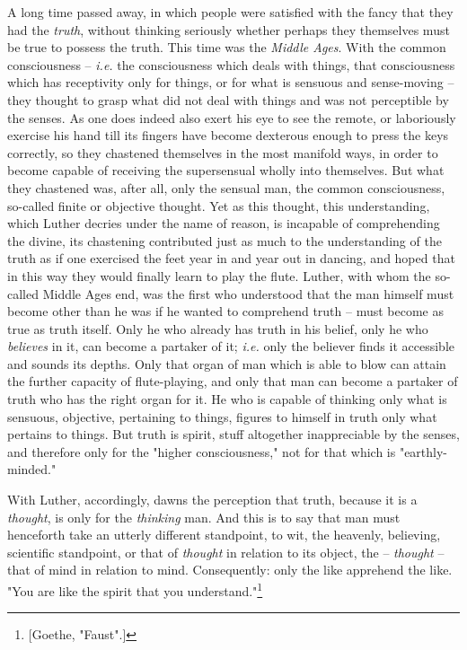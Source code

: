 A long time passed away, in which people were satisfied with the fancy that 
they had the \textit{truth}, without thinking seriously whether perhaps they 
themselves must be true to possess the truth. This time was the \textit{Middle 
Ages}. With the common consciousness -- \textit{i.e.} the consciousness which 
deals with things, that consciousness which has receptivity only for things, 
or for what is sensuous and sense-moving -- they thought to grasp what did not 
deal with things and was not perceptible by the senses. As one does indeed 
also exert his eye to see the remote, or laboriously exercise his hand till 
its fingers have become dexterous enough to press the keys correctly, so they 
chastened themselves in the most manifold ways, in order to become capable of 
receiving the supersensual wholly into themselves. But what they chastened 
was, after all, only the sensual man, the common consciousness, so-called 
finite or objective thought. Yet as this thought, this understanding, which 
Luther decries under the name of reason, is incapable of comprehending the 
divine, its chastening contributed just as much to the understanding of the 
truth as if one exercised the feet year in and year out in dancing, and hoped 
that in this way they would finally learn to play the flute. Luther, with whom 
the so-called Middle Ages end, was the first who understood that the man 
himself must become other than he was if he wanted to comprehend truth -- must 
become as true as truth itself. Only he who already has truth in his belief, 
only he who \textit{believes} in it, can become a partaker of it; 
\textit{i.e.} only the believer finds it accessible and sounds its depths. 
Only that organ of man which is able to blow can attain the further capacity 
of flute-playing, and only that man can become a partaker of truth who has the 
right organ for it. He who is capable of thinking only what is sensuous, 
objective, pertaining to things, figures to himself in truth only what 
pertains to things. But truth is spirit, stuff altogether inappreciable by the 
senses, and therefore only for the "{}higher consciousness,"{} not for that 
which is "{}earthly-minded."{}

With Luther, accordingly, dawns the perception that truth, because it is a 
\textit{thought}, is only for the \textit{thinking} man. And this is to say 
that man must henceforth take an utterly different standpoint, to wit, the 
heavenly, believing, scientific standpoint, or that of \textit{thought} in 
relation to its object, the -- \textit{thought} -- that of mind in relation to 
mind. Consequently: only the like apprehend the like. "{}You are like the 
spirit that you understand."{}\footnote{[Goethe, "{}Faust"{}.]}

